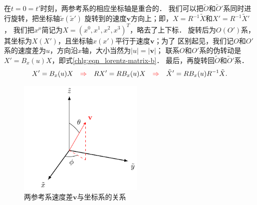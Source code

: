 在$t=0=t'$时刻，两参考系的相应坐标轴是重合的．
我们可以把$\tilde{O}$和$\tilde{O}'$系同时进行旋转，把坐标轴$\tilde{x}(\tilde{x}')$
旋转到的速度$\boldsymbol{v}$方向上；即，$X=R^{-1}\tilde{X}$和$X'=R^{-1}\tilde{X}'$，
我们把$x^\mu$简记为$X=(x^0,x^1,x^2,x^3)^T$，略去了上下标．
旋转后为$O(O')$系，其坐标为$X(X')$，且坐标轴$x(x')$平行于速度$\boldsymbol{v}$；为了
区别起见，我们记$O$和$O'$系的速度差为$u$，方向沿$x$轴，大小当然为$|u|=|\boldsymbol{v}|$；
联系$O$和$O'$系的伪转动是$X' = {B_x}(u)X$，即式\eqref{chlg:eqn_lorentz-matrix-b}．
最后，再旋转回$\tilde{O}$和$\tilde{O}'$系．
\begin{equation} \label{chlg:eqn_rboostr}
    X' = {B_x}(u)X {\quad \color{red}\Rightarrow\quad } RX' = R{B_x}(u)X
    {\quad \color{red}\Rightarrow\quad }  \tilde{X}' = R{B_x}(u)R^{-1}\tilde{X} .
\end{equation}


\begin{figure}[htb]
    \centering
    \includegraphics[width=6cm]{fig/ch13-boost.pdf}
    \caption{两参考系速度差$\boldsymbol{v}$与坐标系的关系} \label{chlg:fig_cart_sph}
\end{figure}


